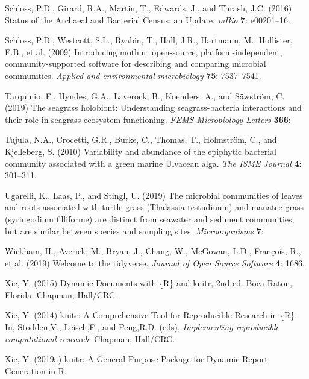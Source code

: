 \documentclass[12pt,]{article}
\begin{document}
\leavevmode\hypertarget{ref-Schloss2016}{}%
Schloss, P.D., Girard, R.A., Martin, T., Edwards, J., and Thrash, J.C.
(2016) Status of the Archaeal and Bacterial Census: an Update.
\emph{mBio} \textbf{7}: e00201--16.

\leavevmode\hypertarget{ref-Schloss2009}{}%
Schloss, P.D., Westcott, S.L., Ryabin, T., Hall, J.R., Hartmann, M.,
Hollister, E.B., et al. (2009) Introducing mothur: open-source,
platform-independent, community-supported software for describing and
comparing microbial communities. \emph{Applied and environmental
microbiology} \textbf{75}: 7537--7541.

\leavevmode\hypertarget{ref-Tarquinio2019}{}%
Tarquinio, F., Hyndes, G.A., Laverock, B., Koenders, A., and Säwström,
C. (2019) The seagrass holobiont: Understanding seagrass-bacteria
interactions and their role in seagrass ecosystem functioning.
\emph{FEMS Microbiology Letters} \textbf{366}:

\leavevmode\hypertarget{ref-Tujula2010}{}%
Tujula, N.A., Crocetti, G.R., Burke, C., Thomas, T., Holmström, C., and
Kjelleberg, S. (2010) Variability and abundance of the epiphytic
bacterial community associated with a green marine Ulvacean alga.
\emph{The ISME Journal} \textbf{4}: 301--311.

\leavevmode\hypertarget{ref-Ugarelli2019}{}%
Ugarelli, K., Laas, P., and Stingl, U. (2019) The microbial communities
of leaves and roots associated with turtle grass (Thalassia testudinum)
and manatee grass (syringodium filliforme) are distinct from seawater
and sediment communities, but are similar between species and sampling
sites. \emph{Microorganisms} \textbf{7}:

\leavevmode\hypertarget{ref-Wickham2019}{}%
Wickham, H., Averick, M., Bryan, J., Chang, W., McGowan, L.D., François,
R., et al. (2019) Welcome to the tidyverse. \emph{Journal of Open Source
Software} \textbf{4}: 1686.

\leavevmode\hypertarget{ref-Xie2015}{}%
Xie, Y. (2015) Dynamic Documents with \{R\} and knitr, 2nd ed. Boca
Raton, Florida: Chapman; Hall/CRC.

\leavevmode\hypertarget{ref-Xie2014}{}%
Xie, Y. (2014) knitr: A Comprehensive Tool for Reproducible Research in
\{R\}. In, Stodden,V., Leisch,F., and Peng,R.D. (eds),
\emph{Implementing reproducible computational research}. Chapman;
Hall/CRC.

\leavevmode\hypertarget{ref-Xie2019a}{}%
Xie, Y. (2019a) knitr: A General-Purpose Package for Dynamic Report
Generation in R.
\end{document}
